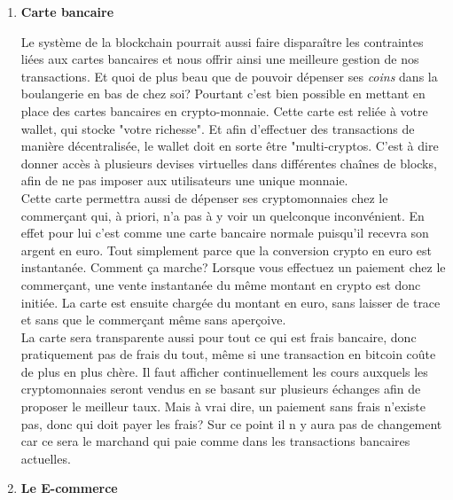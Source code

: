 \documentclass[12pt]{report}
\begin{document}
    \begin{enumerate}
    
        \item \textbf{Carte bancaire}
   

\hspace{1cm} Le système de la blockchain pourrait aussi faire disparaître les contraintes liées aux cartes bancaires et nous offrir ainsi une meilleure gestion de nos transactions. Et quoi de plus beau que de pouvoir dépenser ses \textit{coins} dans la boulangerie en bas de chez soi? Pourtant c'est bien possible en mettant en place des cartes bancaires en crypto-monnaie. Cette carte est reliée à votre wallet, qui stocke "votre richesse". Et afin d'effectuer des transactions de manière décentralisée, le wallet doit en sorte être "multi-cryptos. C'est à dire donner accès à plusieurs devises virtuelles dans différentes chaînes de blocks, afin de ne pas imposer aux utilisateurs une unique monnaie. \\

\hspace{1cm} Cette carte permettra aussi de dépenser ses cryptomonnaies chez le commerçant qui, à priori, n'a pas à y voir un quelconque inconvénient. En effet pour lui c'est comme une carte bancaire normale puisqu'il recevra son argent en euro. Tout simplement parce que la conversion crypto en euro est instantanée. Comment ça marche? Lorsque vous effectuez un paiement chez le commerçant, une vente instantanée du même montant en crypto est donc initiée. La carte est ensuite chargée du montant en euro, sans laisser de trace et sans que le commerçant même sans aperçoive.\\

\hspace{1cm} La carte sera transparente aussi pour tout ce qui est frais bancaire, donc pratiquement pas de frais du tout, même si une transaction en bitcoin coûte de plus en plus chère. Il faut afficher continuellement les cours auxquels les cryptomonnaies seront vendus en se basant sur plusieurs échanges afin de proposer le meilleur taux. Mais à vrai dire, un paiement sans frais n'existe pas, donc qui doit payer les frais? Sur ce point il n y aura pas de changement car ce sera le marchand qui paie comme dans les transactions bancaires actuelles.\\



     \item \textbf{Le E-commerce}


\end{enumerate}
\end{document}
